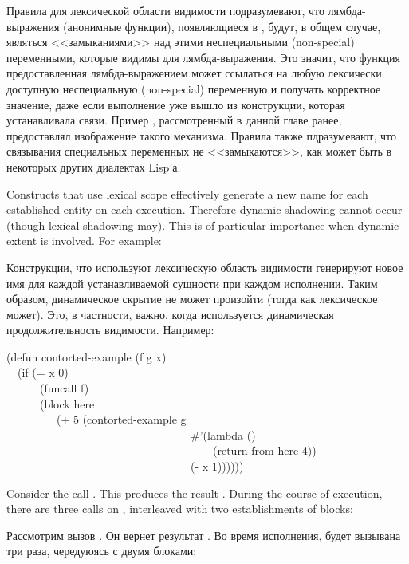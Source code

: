 Правила для лексической области видимости подразумевают, что лямбда-выражения
(анонимные функции), появляющиеся в , будут, в общем случае,
являться <<замыканиями>> над этими неспециальными (non-special) переменными,
которые видимы для лямбда-выражения.
Это значит, что функция предоставленная лямбда-выражением может ссылаться на
любую лексически доступную неспециальную (non-special) переменную и получать
корректное значение, даже если выполнение уже вышло из конструкции, которая
устанавливала связи.
Пример , рассмотренный в данной главе ранее, предоставлял
изображение такого механизма.
Правила также пдразумевают, что связывания специальных переменных не
<<замыкаются>>, как может быть в некоторых других диалектах Lisp'а.

Constructs that use lexical scope effectively
generate a new name for each established entity on each execution.
Therefore dynamic shadowing cannot occur (though lexical shadowing may).
This is of particular importance when dynamic extent is involved.
For example:

Конструкции, что используют лексическую область видимости генерируют новое имя
для каждой устанавливаемой сущности при каждом исполнении.
Таким образом, динамическое скрытие не может произойти (тогда как лексическое
может).
Это, в частности, важно, когда используется динамическая продолжительность
видимости.
Например:

\begin{lisp}
(defun contorted-example (f g x) \\
~~(if (= x 0) \\
~~~~~~(funcall f) \\
~~~~~~(block here \\
~~~~~~~~~(+ 5 (contorted-example g \\
~~~~~~~~~~~~~~~~~~~~~~~~~~~~~~~~~\#'(lambda () \\
~~~~~~~~~~~~~~~~~~~~~~~~~~~~~~~~~~~~~(return-from here 4)) \\
~~~~~~~~~~~~~~~~~~~~~~~~~~~~~~~~~(- x 1))))))
\end{lisp}
Consider the call .  This produces
the result .  During the course of execution, there are three
calls on , interleaved with two establishments
of blocks:

Рассмотрим вызов . Он вернет результат
. Во время исполнения,  будет вызывана три раза,
чередуюясь с двумя блоками:

